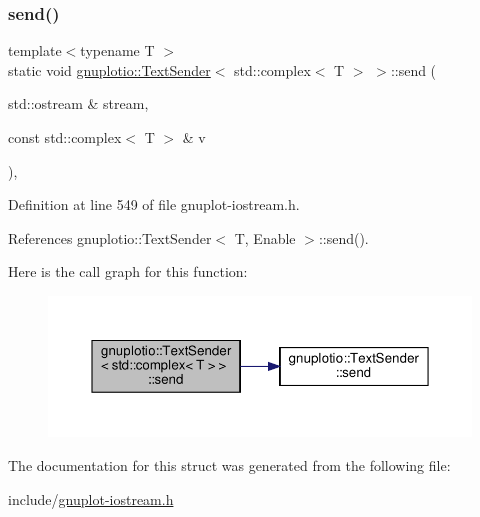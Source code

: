 \subsubsection{\texorpdfstring{send()}{send()}}
{\footnotesize\ttfamily template$<$typename T $>$ \\
static void \hyperlink{structgnuplotio_1_1_text_sender}{gnuplotio\+::\+Text\+Sender}$<$ std\+::complex$<$ T $>$ $>$\+::send (\begin{DoxyParamCaption}\item[{std\+::ostream \&}]{stream,  }\item[{const std\+::complex$<$ T $>$ \&}]{v }\end{DoxyParamCaption})\hspace{0.3cm}{\ttfamily [inline]}, {\ttfamily [static]}}



Definition at line 549 of file gnuplot-\/iostream.\+h.



References gnuplotio\+::\+Text\+Sender$<$ T, Enable $>$\+::send().

Here is the call graph for this function\+:\nopagebreak
\begin{figure}[H]
\begin{center}
\leavevmode
\includegraphics[width=350pt]{structgnuplotio_1_1_text_sender_3_01std_1_1complex_3_01_t_01_4_01_4_ad524aa3e121d0ebd66346d77f1fd5a1c_cgraph}
\end{center}
\end{figure}


The documentation for this struct was generated from the following file\+:\begin{DoxyCompactItemize}
\item 
include/\hyperlink{gnuplot-iostream_8h}{gnuplot-\/iostream.\+h}\end{DoxyCompactItemize}
